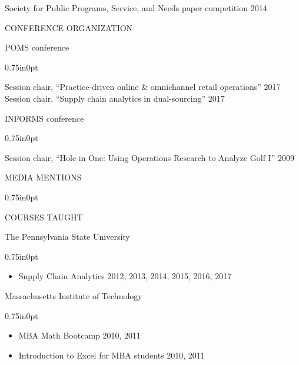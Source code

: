\documentclass[letterpaper,11pt,oneside]{article}
\newcommand\myIndent{0.75in}
\newcommand\myParSkip{3pt}
\newcommand\myHangIndent{1in}
\newcommand\mySpaceBeforeSection{0.9em}
\newcommand\myNegSpaceCorrectBib{-4.25em}
\newcommand\mySpaceBeforeSectionAfterBib{0em}
\newcommand{\NiceIndent}{ \parindent=\myIndent \hangindent=\myHangIndent }
\newenvironment{miniListBullet}
    {
        \begin{adjustwidth}{\myIndent}{0pt}
        \setlength{\parskip}{0pt}%
        \renewcommand\labelitemi{{\boldmath$\cdot$}}
        \begin{itemize}
        \setlength\itemsep{0em}
    }
    {
        \end{itemize}
        \setlength{\parskip}{\myParSkip}%
        \end{adjustwidth}
    }
\begin{document}
\NiceIndent Society for Public Programs, Service, and Needs paper competition 2014



\vspace{\mySpaceBeforeSection}
\noindent CONFERENCE ORGANIZATION

\NiceIndent POMS conference
\begin{miniListBullet}
    Session chair, ``Practice-driven online \& omnichannel retail operations'' 2017 \\
    Session chair, ``Supply chain analytics in dual-sourcing'' 2017
\end{miniListBullet}

\NiceIndent INFORMS conference
\begin{miniListBullet}
    Session chair, ``Hole in One: Using Operations Research to Analyze Golf I'' 2009
\end{miniListBullet}


\vspace{\mySpaceBeforeSection}

\noindent MEDIA MENTIONS

\vspace{\myNegSpaceCorrectBib}
\begin{bibunit}
    \begin{adjustwidth}{\myIndent}{0pt}
        
        \nocite{barrett_crunch_2014}
        \nocite{agger_dark_2010}
        \nocite{newport_stat_2010}
        
        \putbib
    \end{adjustwidth}
\end{bibunit}

\vspace{\mySpaceBeforeSectionAfterBib}
\noindent COURSES TAUGHT

\NiceIndent The Pennsylvania State University
\begin{miniListBullet}
    \item Supply Chain Analytics 2012, 2013, 2014, 2015, 2016, 2017
\end{miniListBullet}

\NiceIndent Massachusetts Institute of Technology
\begin{miniListBullet}
    \item MBA Math Bootcamp 2010, 2011
    \item Introduction to Excel for MBA students 2010, 2011
\end{miniListBullet}
\end{document}
